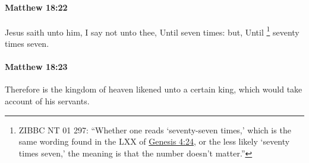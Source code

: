 		\paragraph{Matthew 18:22} %
			\label{MATTHEW-18-22}

			Jesus saith unto him, I say not unto thee, Until seven times: but, Until
				\footnote{%
					ZIBBC NT 01 297: ``Whether one reads `seventy-seven times,' which is the same wording found in the LXX of \hyperref[GENESIS-4-24]{Genesis 4:24}, or the less likely `seventy times seven,' the meaning is that the number doesn't matter.''
					}%
			seventy times seven.

			\begin{framed}
			\scriptsize
				\begin{compactdesc}
					\item[SBLG] 
				\end{compactdesc}
			\end{framed}

		\paragraph{Matthew 18:23} %
			\label{MATTHEW-18-23}

			Therefore is the kingdom of heaven likened unto a certain king, which would take account of his servants.

